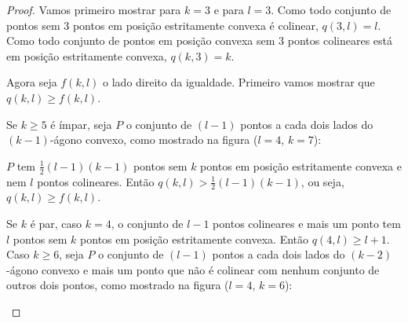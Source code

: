 \begin{proof}
    Vamos primeiro mostrar para $k=3$ e para $l=3$.
    Como todo conjunto de pontos sem $3$ pontos em posição estritamente convexa é colinear, $q(3,l) = l$.
    Como todo conjunto de pontos em posição convexa sem $3$ pontos colineares está em posição estritamente convexa, $q(k,3)=k$.

    Agora seja $f(k,l)$ o lado direito da igualdade. Primeiro vamos mostrar que $q(k,l)\geq f(k,l)$.

    Se $k\geq5$ é ímpar, seja $P$ o conjunto de $(l-1)$ pontos a cada dois lados do $(k-1)$-ágono convexo, como mostrado na figura ($l=4$, $k=7$):
    \begin{center}
    \end{center}
   
    $P$ tem $\frac{1}{2}(l-1)(k-1)$ pontos sem $k$ pontos em posição estritamente convexa e nem $l$ pontos colineares. Então $q(k,l)>\frac{1}{2}(l-1)(k-1)$, ou seja, $q(k,l)\geq f(k,l)$.

    Se $k$ é par, caso $k=4$, o conjunto de $l-1$ pontos colineares e mais um ponto tem $l$ pontos sem $k$ pontos em posição estritamente convexa. Então $q(4,l)\geq l+1$.
    Caso $k\geq 6$, seja $P$ o conjunto de $(l-1)$ pontos a cada dois lados do $(k-2)$-ágono convexo e mais um ponto que não é colinear com nenhum conjunto de outros dois pontos, como mostrado na figura ($l=4$, $k=6$):
    \begin{center}
\end{center}
\end{proof}
